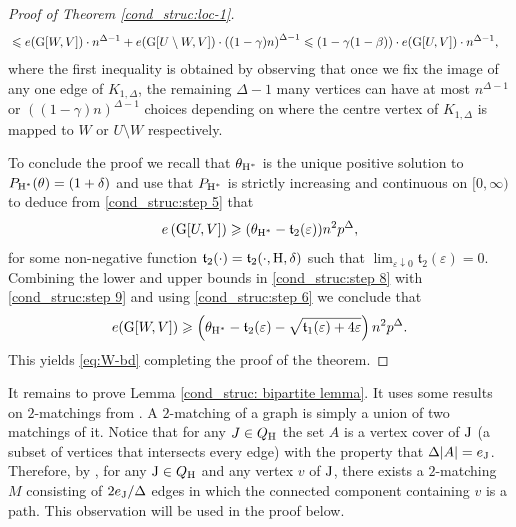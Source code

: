 \documentclass[a4paper,11pt,english,reqno]{amsart}
\numberwithin{equation}{section}
\renewcommand{\leq}{\leqslant}
\renewcommand{\geq}{\geqslant}
\newcommand{\uH}{\textup{H}}
\newcommand{\tu}[1]{\textup{#1}}
\begin{document}
\begin{proof}[Proof of Theorem \ref{cond_struc:loc-1}]
\begin{equation}
\begin{aligned}
						& \leq e(\tu{G}[W,V]) \cdot n^{\Delta-1} + e(\tu{G}[U\setminus W,V])\cdot \left((1-\gamma)n\right)^{\Delta-1}\leq \left(1-\gamma(1-\beta)\right)\cdot e(\tu{G}[U,V]) \cdot n^{\Delta-1},
					\end{aligned}
				\end{equation}
				where the first inequality is obtained by observing that once we fix the image of any one edge of $K_{1,\Delta}$, the remaining $\Delta-1$ many vertices can have at most $n^{\Delta-1}$ or $((1-\gamma)n)^{\Delta-1}$ choices depending on where the centre vertex of $K_{1,\Delta}$ is mapped to $W$ or $U\setminus W$ respectively. 
				
				To conclude the proof we recall that $\theta_{\uH^{*}}$ is the unique positive solution to $P_{\uH^{*}}(\theta) = (1+\delta)$ and use that  $P_{\uH^{*}}$ is strictly increasing and continuous on $[0,\infty)$ to deduce from  \eqref{cond_struc:step 5} that 
				\begin{equation}
					\label{cond_struc:step 6}
					e\left(\tu{G}[U,V]\right)\geq (\theta_{\uH^{*}}- \mathfrak{t}_2(\varepsilon)) n^{2}p^{\Delta},
				\end{equation} 
				for some non-negative function $\mathfrak{t}_2(\cdot) = \mathfrak{t}_2(\cdot, \uH, \delta)$ such that $\lim_{\varepsilon \downarrow 0} \mathfrak{t}_2(\varepsilon)=0$. 
				Combining the lower and upper bounds in \eqref{cond_struc:step 8} with \eqref{cond_struc:step 9} and using \eqref{cond_struc:step 6} we conclude that 
				\begin{equation}
					e(\tu{G}[W,V])\geq \left(\theta_{\uH^{*}}-\mathfrak{t}_2(\varepsilon)-\sqrt{\mathfrak{t}_{1}(\varepsilon)+4\varepsilon}\right) n^{2}p^{\Delta}.
				\end{equation}
				This yields \eqref{eq:W-bd} completing the proof of the theorem.
			\end{proof}
			
			It remains to prove Lemma \ref{cond_struc: bipartite lemma}. It uses some results on $2$-matchings from \cite[Section 7]{BGLZ}. A $2$-matching of a graph is simply a union of two matchings of it. Notice that for any $J \in Q_{\uH}$ the set $A$ is a vertex cover of $\tu{J}$ (a subset of vertices that intersects every edge) with the property that $\Delta |A| = e_{\tu{J}}$. Therefore, by \cite[Lemma 7.1]{BGLZ}, for any $\tu{J} \in Q_{\uH}$ and any vertex $v$ of $\tu{J}$, there exists a $2$-matching $M$ consisting of $2e_{\tu{J}}/\Delta$ edges in which the connected component containing $v$ is a path. This observation will be used in the proof below.
			
\end{document}
